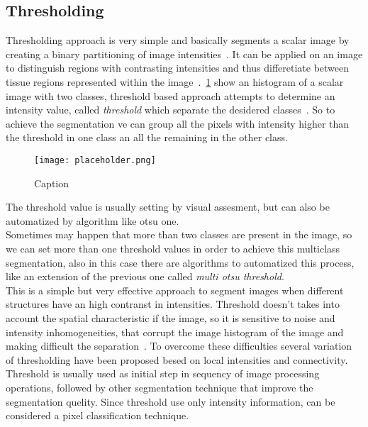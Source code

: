 \documentclass{standalone}
\begin{document}
\subsection{Thresholding}

Thresholding approach is very simple and basically segments a scalar image by creating a binary partitioning of image intensities~\cite{ART:Pham}. It can be applied on an image to distinguish regions with contrasting intensities and thus differetiate between tissue regions represented within the image~\cite{INP:Withey}. \figurename\,\ref{fig:Histogram} show an histogram of a scalar image with two classes, threshold based approach attempts to determine an intensity value, called \emph{threshold} which separate the desidered classes~\cite{ART:Pham}. So to achieve the segmentation ve can group all the pixels with intensity higher than the threshold in one class an all the remaining in the other class. 

\begin{figure}[hp]
\label{fig:Histogram}
	\centering
		\texttt{[image: placeholder.png]}
	\caption{Caption}
\end{figure}

The threshold value is usually setting by visual assesment, but can also be automatized by algorithm like otsu one.\\
Sometimes may happen that more than two classes are present in the image, so we can set more than one threshold values in order to achieve this multiclass segmentation, also in this case there are algorithms to automatized this process, like an extension of the previous one called \emph{multi otsu threshold}.\\
This is a simple but very effective approach to segment images when different structures have an high contranst in intensities. Threshold doesn't takes into account the spatial characteristic if the image, so it is sensitive to noise and intensity inhomogeneities, that corrupt the image histogram of the image and making difficult the separation~\cite{ART:Pham}. To overcome these difficulties several variation of thresholding have been proposed besed on local intensities and connectivity. \\
Threshold is usually used as initial step in sequency of image processing operations, followed by other segmentation technique that improve the segmentation quelity. 
Since threshold use only intensity information, can be considered a pixel classification technique. 
\end{document}
